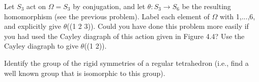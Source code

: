 \documentclass[12pt,letterpaper,boxed]{hmcpset}
\begin{document}
\begin{solution}
\end{solution}

\clearpage

\begin{problem}[11.4.5]
Let $S_3$ act on $\Omega = S_3$ by conjugation, and let $\theta: S_3 \rightarrow S_6$ be the resulting homomorphism (see the previous problem). Label each element of $\Omega$ with 1,...,6, and explicitly give $\theta$((1 2 3)). Could you have done this problem more easily if you had used the Cayley diagraph of this action given in Figure 4.4? Use the Cayley diagraph to give $\theta$((1 2)).
\end{problem}

\begin{solution}
\end{solution}

\clearpage

\begin{problem}[11.4.8]
Identify the group of the rigid symmetries of a regular tetrahedron (i.e., find a well known group that is isomorphic to this group).
\end{problem}

\begin{solution}
\end{solution}

\clearpage
\end{document}
